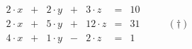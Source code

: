 \documentclass[11pt]{article}
\begin{document}
\[
\begin{array}{lclcrcrr}
2 \cdot x & + & 2 \cdot y & + &  3 \cdot z & = & 10 \\
2 \cdot x & + & 5 \cdot y & + & 12 \cdot z & = & 31 & \qquad (\dagger)\\
4 \cdot x & + & 1 \cdot y & - &  2 \cdot z & = &  1
\end{array}
\]
\end{document}
